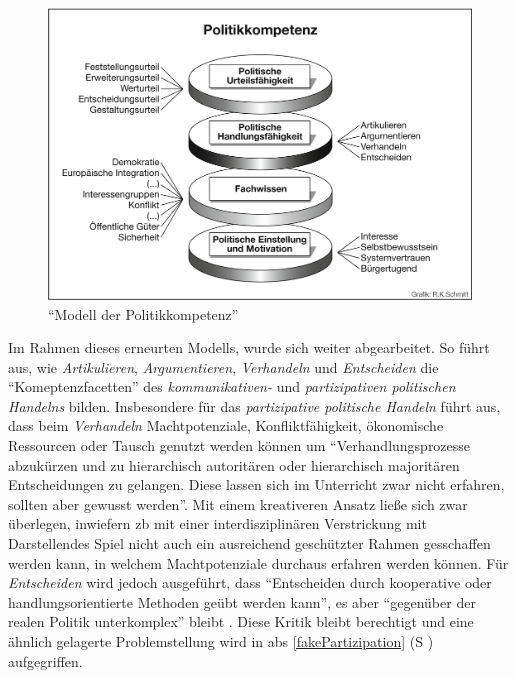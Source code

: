 \begin{figure}[htb]
    \centering
    \includegraphics[width=1\linewidth]{Detjen et al. 2012 p. 15.png}
    \caption{\enquote{Modell der Politikkompetenz} \autocite[15]{Detjen.2012}}
    \label{2012kompMod}
\end{figure}

Im Rahmen dieses erneurten Modells, wurde sich weiter abgearbeitet. So führt \textcite[27]{Massing2012} aus, wie \emph{Artikulieren}, \emph{Argumentieren}, \emph{Verhandeln} und \emph{Entscheiden} die \enquote{Komeptenzfacetten} des \emph{kommunikativen-} und \emph{partizipativen politischen Handelns} bilden. 
Insbesondere für das \emph{partizipative politische Handeln} führt \textcite[27]{Massing2012} aus, dass beim \emph{Verhandeln} Machtpotenziale, Konfliktfähigkeit, ökonomische Ressourcen oder Tausch genutzt werden können um \enquote{Verhandlungsprozesse abzukürzen und zu hierarchisch autoritären oder hierarchisch majoritären Entscheidungen zu gelangen. Diese lassen sich im Unterricht zwar nicht erfahren, sollten aber gewusst werden}. 
Mit einem kreativeren Ansatz ließe sich zwar überlegen, inwiefern \gls{zb} mit einer interdisziplinären Verstrickung mit Darstellendes Spiel nicht auch ein ausreichend geschützter Rahmen gesschaffen werden kann, in welchem Machtpotenziale durchaus erfahren werden können. Für \emph{Entscheiden} wird jedoch ausgeführt, dass \enquote{Entscheiden durch kooperative oder handlungsorientierte Methoden geübt werden kann}, es aber \enquote{gegenüber der realen Politik unterkomplex} bleibt \autocite[27]{Massing2012}. Diese Kritik bleibt berechtigt und eine ähnlich gelagerte Problemstellung wird in \gls{abs} \ref{fakePartizipation} (\gls{S} \pageref{fakePartizipation}) aufgegriffen. 



